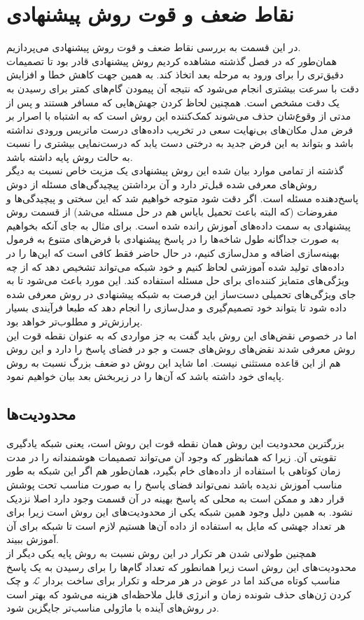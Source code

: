 \section{نقاط ضعف و قوت روش پیشنهادی}
  در این قسمت به بررسی نقاط ضعف و قوت روش پیشنهادی می‌پردازیم.
  \\
  همان‌طور که در فصل گذشته مشاهده کردیم روش پیشنهادی قادر بود تا تصمیمات دقیق‌تری را برای ورود به مرحله بعد اتخاذ کند. به همین جهت کاهش خطا و افزایش دقت با سرعت بیشتری انجام می‌شود که نتیجه آن پیمودن گام‌های کمتر برای رسیدن به یک دقت مشخص است. همچنین لحاظ کردن جهش‌هایی که مسافر هستند و پس از مدتی از وقوع‌شان حذف می‌شوند کمک‌کننده این روش است که به اشتباه با اصرار بر فرض مدل مکان‌های بی‌نهایت سعی در تخریب داده‌های درست ماتریس ورودی نداشته باشد و بتواند به این فرض جدید به درختی دست یابد که درست‌نمایی بیشتری را نسبت به حالت روش پایه داشته باشد.
  \\
  گذشته از تمامی موارد بیان شده این روش پیشنهادی یک مزیت خاص نسبت به دیگر روش‌های معرفی شده قبل‌تر دارد و آن برداشتن پیچیدگی‌های مسئله از دوش پاسخ‌دهنده مسئله است. اگر دقت شود متوجه خواهیم شد که این سختی و پیچیدگی‌ها و مفروضات (که البته باعث تحمیل بایاس هم در حل مسئله می‌شد) از قسمت روش پیشنهادی به سمت داده‌های آموزش رانده شده است. برای مثال به جای آنکه بخواهیم به صورت جداگانه طول شاخه‌ها را در پاسخ پیشنهادی با فرض‌های متنوع به فرمول بهینه‌سازی اضافه و مدل‌سازی کنیم، در حال حاضر فقط کافی است که این‌ها را در داده‌های تولید شده آموزشی لحاظ کنیم و خود شبکه می‌تواند تشخیص دهد که از چه ویژگی‌های متمایز کننده‌ای برای حل مسئله استفاده کند. این مورد باعث می‌شود تا به جای ویژگی‌های تحمیلی دست‌ساز این فرصت به شبکه پیشنهادی در روش معرفی شده داده شود تا بتواند خود تصمیم‌گیری و مدل‌سازی را انجام دهد که طبعا فرآیندی بسیار پرارزش‌تر و مطلوب‌تر خواهد بود.
  \\
  اما در خصوص نقض‌های این روش باید گفت به جز مواردی که به عنوان نقطه قوت این روش معرفی شدند نقض‌های روش‌های جست و جو در فضای پاسخ را دارد و این روش هم از این قاعده مستثنی نیست. اما شاید این روش دو ضعف بزرگ نسبت به روش پایه‌ای خود داشته باشد که آن‌ها را در زیربخش بعد بیان خواهیم نمود.
 \subsection{محدودیت‌ها}
  بزرگترین محدودیت این روش همان نقطه قوت این روش است، یعنی شبکه یادگیری تقویتی آن. زیرا که همانظور که وجود آن می‌تواند تصمیمات هوشمندانه را در مدت زمان کوتاهی با استفاده از داد‌ه‌های خام بگیرد، همان‌طور هم اگر این شبکه به طور مناسب آموزش ندیده باشد نمی‌تواند فضای پاسخ را به صورت مناسب تحت پوشش قرار دهد و ممکن است به محلی که پاسخ بهینه در آن قسمت وجود دارد اصلا نزدیک نشود. به همین دلیل وجود همین شبکه یکی از محدودیت‌های این روش است زیرا برای هر تعداد جهشی که مایل به استفاده از داده آن‌ها هستیم لازم است تا شبکه برای آن آموزش ببیند.
  \\
  همچنین طولانی شدن هر تکرار در این روش نسبت به روش پایه یکی دیگر از محدودیت‌های این روش است زیرا همانطور که تعداد گام‌ها را برای رسیدن به یک پاسخ مناسب کوتاه می‌کند اما در عوض در هر مرحله و تکرار برای ساخت بردار $\mathcal{L}$ و چک کردن ژن‌های حذف شونده زمان و انرژی قابل ملاحظه‌ای هزینه می‌شود که بهتر است در روش‌های آینده با ماژولی مناسب‌تر جایگزین شود.
  
